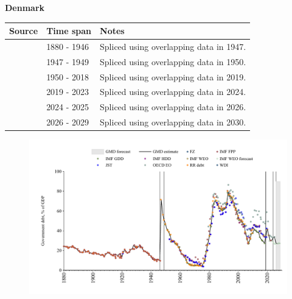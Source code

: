 \documentclass[12pt,a4paper,landscape]{article}
\begin{document}
\begin{adjustbox}{max totalsize={\paperwidth}{\paperheight},center}
\begin{minipage}[t][\textheight][t]{\textwidth}
\vspace*{0.5cm}
{}
\begin{center}
{\Large\bfseries Denmark}
\end{center}
\vspace{0.5cm}
\begin{table}[H]
\centering
\small
\begin{tabular}{|l|l|l|}
\hline
\textbf{Source} & \textbf{Time span} & \textbf{Notes} \\
\hline
\rowcolor{white}\cite{IMF_FPP}& 1880 - 1946 &Spliced using overlapping data in 1947.\\
\rowcolor{lightgray}\cite{RR_debt}& 1947 - 1949 &Spliced using overlapping data in 1950.\\
\rowcolor{white}\cite{IMF_GDD}& 1950 - 2018 &Spliced using overlapping data in 2019.\\
\rowcolor{lightgray}\cite{IMF_FPP}& 2019 - 2023 &Spliced using overlapping data in 2024.\\
\rowcolor{white}\cite{OECD_EO}& 2024 - 2025 &Spliced using overlapping data in 2026.\\
\rowcolor{lightgray}\cite{IMF_WEO_forecast}& 2026 - 2029 &Spliced using overlapping data in 2030.\\
\hline
\end{tabular}
\end{table}
\begin{figure}[H]
\centering
\includegraphics[width=\textwidth,height=0.6\textheight,keepaspectratio]{graphs/DNK_govdebt_GDP.pdf}
\end{figure}
\end{minipage}
\end{adjustbox}
\end{document}
